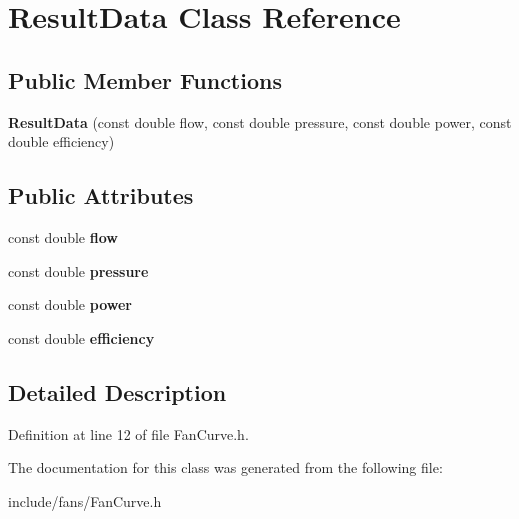 \hypertarget{class_result_data}{}\section{Result\+Data Class Reference}
\label{class_result_data}
\subsection*{Public Member Functions}
\begin{DoxyCompactItemize}
\item 
\mbox{\label{class_result_data_ab10ba8e317d8b9d830c5f90debfbb15b}} 
{\bfseries Result\+Data} (const double flow, const double pressure, const double power, const double efficiency)
\end{DoxyCompactItemize}
\subsection*{Public Attributes}
\begin{DoxyCompactItemize}
\item 
\mbox{\label{class_result_data_ae8459ee960a807938dfe6eaa265531cc}} 
const double {\bfseries flow}
\item 
\mbox{\label{class_result_data_a496cd3f0c80f254fcf2ebd7f3476e6dd}} 
const double {\bfseries pressure}
\item 
\mbox{\label{class_result_data_a990344826f779c300db9e3128f160c1e}} 
const double {\bfseries power}
\item 
\mbox{\label{class_result_data_a1b75ddc30c8470877bc93bfa6ccafa0e}} 
const double {\bfseries efficiency}
\end{DoxyCompactItemize}


\subsection{Detailed Description}


Definition at line 12 of file Fan\+Curve.\+h.



The documentation for this class was generated from the following file\+:\begin{DoxyCompactItemize}
\item 
include/fans/Fan\+Curve.\+h\end{DoxyCompactItemize}
